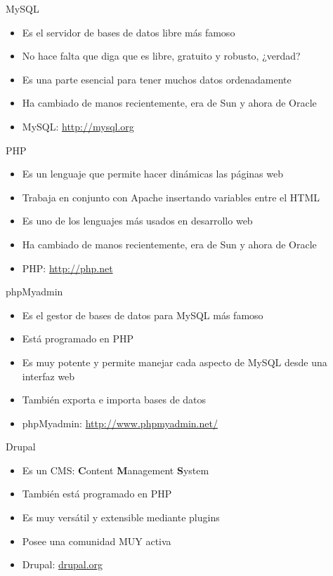 \documentclass[spanish]{beamer}
\begin{document}
\begin{frame}{MySQL}
\begin{itemize}
\item Es el servidor de bases de datos libre más famoso
\item No hace falta que diga que es libre, gratuito y robusto, ¿verdad?
\item Es una parte esencial para tener muchos datos ordenadamente
\item Ha cambiado de manos recientemente, era de Sun y ahora de Oracle
\item MySQL: \url{http://mysql.org}
\end{itemize}
\end{frame}

\begin{frame}{PHP}
\begin{itemize}
\item Es un lenguaje que permite hacer dinámicas las páginas web
\item Trabaja en conjunto con Apache insertando variables entre el HTML
\item Es uno de los lenguajes más usados en desarrollo web
\item Ha cambiado de manos recientemente, era de Sun y ahora de Oracle
\item PHP: \url{http://php.net}
\end{itemize}
\end{frame}

\begin{frame}{phpMyadmin}
\begin{itemize}
\item Es el gestor de bases de datos para MySQL más famoso
\item Está programado en PHP
\item Es muy potente y permite manejar cada aspecto de MySQL desde una interfaz web
\item También exporta e importa bases de datos
\item phpMyadmin: \url{http://www.phpmyadmin.net/}
\end{itemize}
\end{frame}

\begin{frame}{Drupal}
\begin{itemize}
\item Es un CMS: {\bf C}ontent {\bf M}anagement {\bf S}ystem
\item También está programado en PHP
\item Es muy versátil y extensible mediante plugins
\item Posee una comunidad MUY activa
\item Drupal: \url{drupal.org}
\end{itemize}
\end{frame}
\end{document}
